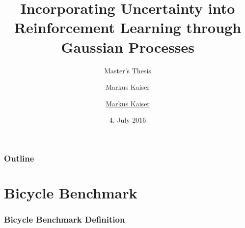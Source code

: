 





\title{Incorporating Uncertainty into Reinforcement Learning through Gaussian Processes}
\author{Markus Kaiser}
\subtitle{Master's Thesis}
\author{\href{mailto:markus.kaiser@in.tum.de}{Markus Kaiser}}
\date{4. July 2016}



\begin{frame}[plain]
    \titlepage
\end{frame}

\begin{frame}
    \frametitle{Outline}

    \tableofcontents
\end{frame}

\section{Bicycle Benchmark}
\begin{frame}
    \frametitle{Bicycle Benchmark Definition}

    \begin{columns}
        \begin{column}[b]{0.5\textwidth}
            \centering
            
        \end{column}
        \begin{column}[b]{0.5\textwidth}
            \centering
            
        \end{column}
    \end{columns}
\end{frame}


